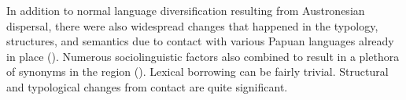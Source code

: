 In addition to normal language diversification resulting from
Austronesian dispersal, there were also widespread changes
that happened in the typology,
structures, and semantics due to contact with various Papuan
languages already in place ().
Numerous sociolinguistic factors also combined to result in a
plethora of synonyms in the region ().
Lexical borrowing can be fairly trivial.
Structural and typological changes from contact are quite significant.